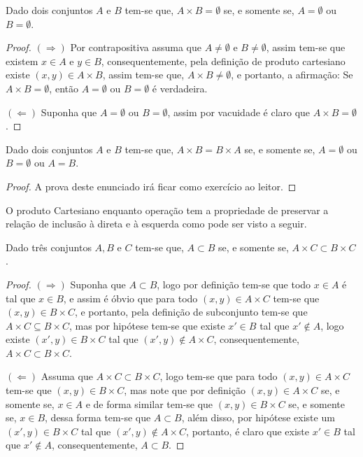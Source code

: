 \begin{theorem}\label{teo:AbsorcaoCatersiano}
	Dado dois conjuntos $A$ e $B$ tem-se que, $A \times B = \emptyset$ se, e somente se, $A = \emptyset$ ou $B = \emptyset$.
\end{theorem}

\begin{proof}
	$(\Rightarrow)$ Por contrapositiva assuma que $A \neq \emptyset$ e $B \neq \emptyset$, assim tem-se que existem $x \in A$ e $y \in B$, consequentemente, pela definição de produto cartesiano existe $(x,y) \in A \times B$, assim tem-se que, $A \times B \neq \emptyset$, e portanto, a afirmação: Se $A \times B = \emptyset$, então $A = \emptyset$ ou $B = \emptyset$ é verdadeira.
	
	$(\Leftarrow)$ Suponha que $A = \emptyset$ ou $B = \emptyset$, assim por vacuidade é claro que $A \times B = \emptyset$.
\end{proof}

\begin{theorem}\label{teo:IgualdadeCartesiano}
	Dado dois conjuntos $A$ e $B$ tem-se que, $A \times B = B \times A$ se, e somente se, $A = \emptyset$ ou $B = \emptyset$ ou $A = B$.
\end{theorem}

\begin{proof}
	A prova deste enunciado irá ficar como exercício ao leitor.
\end{proof}

O produto Cartesiano enquanto operação tem a propriedade de preservar a relação de inclusão à direta e à esquerda como pode ser visto a seguir.

\begin{theorem}\label{teo:CartesianoMonoDireita}
	Dado três conjuntos $A, B$ e $C$ tem-se que, $A \subset B$ se, e somente se, $A \times C \subset B \times C$.
\end{theorem}

\begin{proof}
	$(\Rightarrow)$ Suponha que $A \subset B$, logo por definição tem-se que todo $x \in A$ é tal que $x \in B$, e assim é óbvio que para todo $(x,y) \in A \times C$ tem-se que $(x, y) \in B \times C$, e portanto, pela definição de subconjunto tem-se que $A \times C \subseteq B \times C$, mas por hipótese tem-se que existe $x' \in B$ tal que $x' \notin A$, logo existe $(x', y) \in B \times C$ tal que $(x', y) \notin A \times C$, consequentemente, $A \times C \subset B \times C$.
	
	$(\Leftarrow)$ Assuma que $A \times C \subset B \times C$, logo tem-se que para todo $(x, y) \in A \times C$ tem-se que $(x, y) \in B \times C$, mas note que por definição $(x, y) \in A \times C$ se, e somente se, $x \in A$ e de forma similar tem-se que $(x, y) \in B \times C$ se, e somente se, $x \in B$, dessa forma tem-se que $A \subset B$, além disso, por hipótese existe um $(x', y) \in B \times C$ tal que $(x', y) \notin A \times C$, portanto, é claro que existe $x' \in B$ tal que $x' \notin A$, consequentemente, $A \subset B$.
\end{proof}

